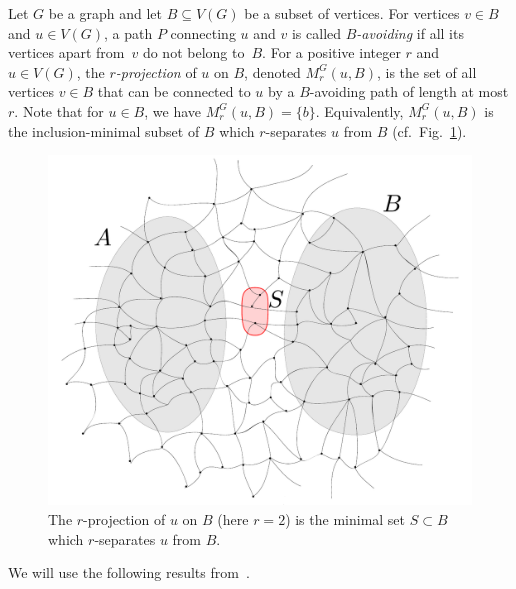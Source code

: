 Let $G$ be a graph and let $B\subseteq V(G)$ be a subset of vertices. For vertices $v\in B$ and $u\in V(G)$, a path $P$ connecting $u$ and $v$ is called {\em{$B$-avoiding}}
if all its vertices apart from~$v$ do not belong to~$B$. For a positive integer $r$ and $u\in V(G)$, the {\em{$r$-projection}} of $u$ on $B$, denoted $M^G_r(u,B)$, is the set of all vertices $v\in B$ that
can be connected to $u$ by a $B$-avoiding path of length at most $r$. Note that for $u\in B$, we have $M^G_r(u,B)=\{b\}$.
Equivalently, $M^G_r(u,B)$ is the inclusion-minimal
subset of $B$ which $r$-separates $u$ from $B$ (cf.~Fig.~\ref{fig:projection}).

%
%
\begin{figure}[h!]
	\centering
		\includegraphics[scale=0.35,page=2]{pics}
	\caption{The  $r$-projection of $u$ on $B$
	(here $r=2$)
	is the minimal set  $S\subset B$
	which $r$-separates $ u$ from $B$.
	}
	\label{fig:projection}
\end{figure}

We will use the following results from~\cite{drange2016kernelization,eickmeyer2016neighborhood}.

